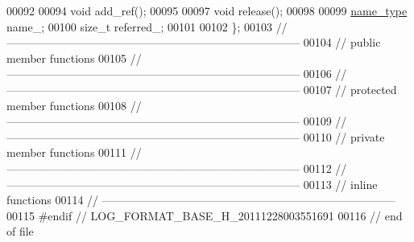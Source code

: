 \begin{DoxyCode}
00092 
00094     \textcolor{keywordtype}{void} add\_ref();
00095 
00097     \textcolor{keywordtype}{void} release();
00098 
00099     \hyperlink{namespacehryky_1_1log_1_1format_ab7408d1e2ed2d648dbf9bba69eb74288}{name_type}   name\_;
00100     \textcolor{keywordtype}{size\_t}      referred\_;
00101 
00102 \};
00103 \textcolor{comment}{//
      ------------------------------------------------------------------------------}
00104 \textcolor{comment}{// public member functions}
00105 \textcolor{comment}{//
      ------------------------------------------------------------------------------}
00106 \textcolor{comment}{//
      ------------------------------------------------------------------------------}
00107 \textcolor{comment}{// protected member functions}
00108 \textcolor{comment}{//
      ------------------------------------------------------------------------------}
00109 \textcolor{comment}{//
      ------------------------------------------------------------------------------}
00110 \textcolor{comment}{// private member functions}
00111 \textcolor{comment}{//
      ------------------------------------------------------------------------------}
00112 \textcolor{comment}{//
      ------------------------------------------------------------------------------}
00113 \textcolor{comment}{// inline functions}
00114 \textcolor{comment}{//
      ------------------------------------------------------------------------------}
00115 \textcolor{preprocessor}{#endif // LOG\_FORMAT\_BASE\_H\_20111228003551691}
00116 \textcolor{preprocessor}{}\textcolor{comment}{// end of file}
\end{DoxyCode}
